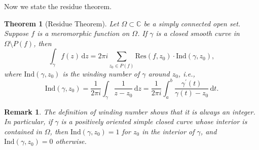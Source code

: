 \documentclass{article}
\newtheorem{theorem}{Theorem}[section]
\newtheorem*{remark}{Remark}
\theoremstyle{definition}
\newcommand{\C}{\mathbb{C}}
\newcommand{\dd}{\mathrm{d}}
\newcommand{\res}{\mathrm{Res}}
\begin{document}
Now we state the residue theorem.
\begin{theorem}[Residue Theorem]
Let \(\Omega\subset\C\) be a simply connected open set. Suppose \(f\) is a meromorphic function on $\Omega$. If \(\gamma\) is a closed smooth curve in \(\Omega\setminus P(f)\), then
\begin{equation*}
    \int_{\gamma} f(z)\, \dd z = 2\pi i \sum_{z_0\in P(f)} \res(f,z_0) \cdot \mathrm{Ind}(\gamma,z_0),
\end{equation*}
where \(\mathrm{Ind}(\gamma,z_0)\) is the winding number of \(\gamma\) around \(z_0\), i.e.,
\begin{equation*}
    \mathrm{Ind}(\gamma,z_0) = \frac{1}{2\pi i} \int_{\gamma} \frac{1}{z-z_0}\, \dd z=\frac{1}{2\pi i}\int_{a}^{b}\frac{\gamma^{\prime}(t)}{\gamma(t)-z_0}\, \dd t.
\end{equation*}
\end{theorem}
\begin{remark}
    The definition of winding number shows that it is always an integer. In particular, if \(\gamma\) is a positively oriented simple closed curve whose interior is contained in \(\Omega\), then \(\mathrm{Ind}(\gamma,z_0)=1\) for \(z_0\) in the interior of \(\gamma\), and \(\mathrm{Ind}(\gamma,z_0)=0\) otherwise.
\end{remark}
\end{document}
